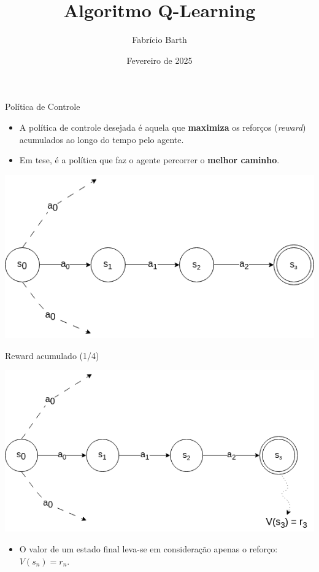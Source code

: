 \documentclass{beamer}
\begin{document}
\title{Algoritmo Q-Learning} 
\author{Fabrício Barth}
\date{Fevereiro de 2025}

\maketitle

\begin{frame}{Política de Controle}
	\begin{itemize}
		\item A política de controle desejada é aquela que \textbf{maximiza} os reforços 
		(\textit{reward}) acumulados ao longo do tempo pelo 
		agente.
		\item Em tese, é a política que faz o agente percorrer o \textbf{melhor caminho}. 
	\end{itemize}
	
	
	\begin{center}
		\includegraphics[width=.8\textwidth]{figuras/grafo_rewards_0.png}
	\end{center}
	
\end{frame}


\begin{frame}{Reward acumulado (1/4)}
	
	\begin{center}
		\includegraphics[width=.8\textwidth]{figuras/grafo_rewards_1.png}
	\end{center}
	
	\begin{itemize}	
		\item O valor de um estado final leva-se em consideração apenas o 
		reforço: $V(s_{n}) = r_{n}$.
	\end{itemize}
	
\end{frame}
\end{document}
